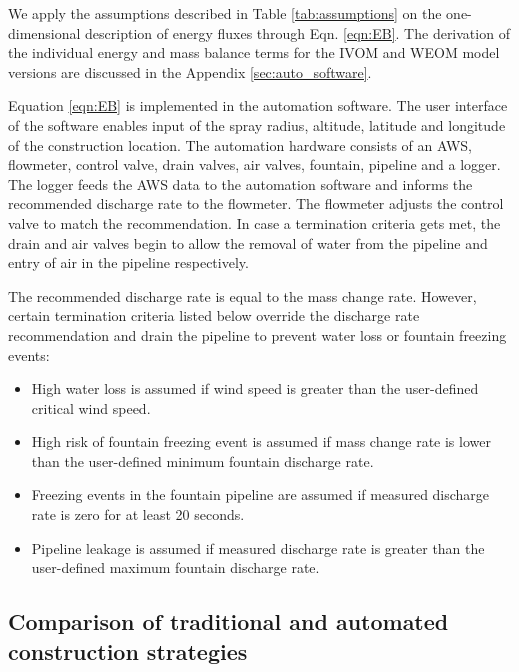 We apply the assumptions described in Table \ref{tab:assumptions} on the one-dimensional description of energy
fluxes through Eqn. \ref{eqn:EB}. The derivation of the individual energy and mass balance terms for the IVOM
and WEOM model versions are discussed in the Appendix \ref{sec:auto_software}.

Equation \ref{eqn:EB} is implemented in the automation software. The user interface of the software enables
input of the spray radius, altitude, latitude and longitude of the construction location. The automation
hardware consists of an AWS, flowmeter, control valve, drain valves, air valves, fountain, pipeline and a
logger. The logger feeds the AWS data to the automation software and informs the recommended discharge rate to
the flowmeter. The flowmeter adjusts the control valve to match the recommendation. In case a termination
criteria gets met, the drain and air valves begin to allow the removal of water from the pipeline and entry of
air in the pipeline respectively.

The recommended discharge rate is equal to the mass change rate. However, certain termination criteria listed
below override the discharge rate recommendation and drain the pipeline to prevent water loss or fountain
freezing events:

\begin{itemize}

\item High water loss is assumed if wind speed is greater than the user-defined critical wind speed.

\item High risk of fountain freezing event is assumed if mass change rate is lower than the user-defined minimum fountain discharge rate. 

\item Freezing events in the fountain pipeline are assumed if measured discharge rate is zero for at least 20
  seconds. 

\item Pipeline leakage is assumed if measured discharge rate is greater than the user-defined maximum fountain discharge rate.

\end{itemize}

\subsection{Comparison of traditional and automated construction strategies}

